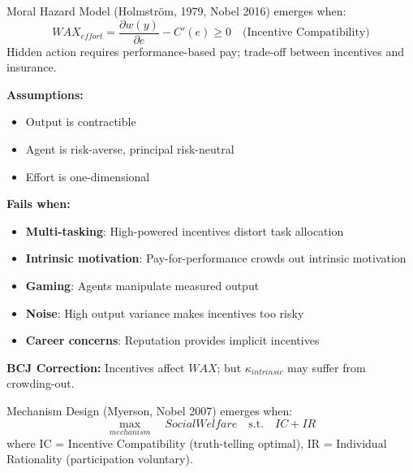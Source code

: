 \begin{theorem}
\label{thm:holmstrom-moral-hazard}
Moral Hazard Model (Holmström, 1979, Nobel 2016) emerges when:
\begin{equation}
\boxed{WAX_{effort} = \frac{\partial w(y)}{\partial e} - C'(e) \geq 0 \quad \text{(Incentive Compatibility)}}
\end{equation}
Hidden action requires performance-based pay; trade-off between incentives and insurance.
\end{theorem}

\begin{tcolorbox}[colback=red!5!white, colframe=red!75!black, title=Boundary Condition: Where Moral Hazard Model Fails]
\textbf{Assumptions:}
\begin{itemize}[nosep]
\item Output is contractible
\item Agent is risk-averse, principal risk-neutral
\item Effort is one-dimensional
\end{itemize}

\textbf{Fails when:}
\begin{itemize}[nosep]
\item \textbf{Multi-tasking}: High-powered incentives distort task allocation
\item \textbf{Intrinsic motivation}: Pay-for-performance crowds out intrinsic motivation
\item \textbf{Gaming}: Agents manipulate measured output
\item \textbf{Noise}: High output variance makes incentives too risky
\item \textbf{Career concerns}: Reputation provides implicit incentives
\end{itemize}

\textbf{BCJ Correction:} Incentives affect $WAX$; but $\kappa_{intrinsic}$ may suffer from crowding-out.
\end{tcolorbox}


\begin{theorem}
\label{thm:mechanism-design}
Mechanism Design (Myerson, Nobel 2007) emerges when:
\begin{equation}
\boxed{\max_{mechanism} \quad Social Welfare \quad \text{s.t.} \quad IC + IR}
\end{equation}
where IC = Incentive Compatibility (truth-telling optimal), IR = Individual Rationality (participation voluntary).
\end{theorem}

